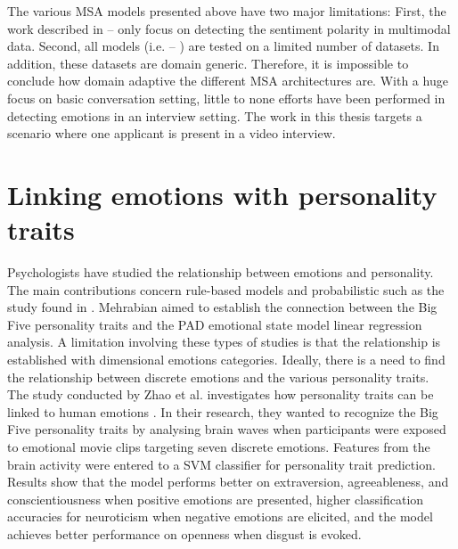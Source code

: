 The various MSA models presented above have two major limitations: First, the work described in \cite{late_fusion_cai2015convolutional} -- \cite{bimodal-fusion1-10.1145/3462244.3479919} only focus on detecting the sentiment polarity in multimodal data. Second, all models (i.e. \cite{tensor_fusion_network_2017} -- \cite{ICON_hazarika-etal-2018-icon}) are tested on a limited number of datasets. In addition, these datasets are domain generic. Therefore, it is impossible to conclude how domain adaptive the different MSA architectures are. With a huge focus on basic conversation setting, little to none efforts have been performed in detecting emotions in an interview setting. The work in this thesis targets a scenario where one applicant is present in a video interview. 

\section{Linking emotions with personality traits}
\label{sec:emotion-personality-link}
Psychologists have studied the relationship between emotions and personality. The main contributions concern rule-based models \cite{rule_based_model_johns2001emotions} and probabilistic such as the study found in \cite{probability_model_andre2000integrating}. Mehrabian \cite{PAD_regression_mehrabian1996pleasure} aimed to establish the connection between the Big Five personality traits and the PAD emotional state model  linear regression analysis. A limitation involving these types of studies is that the relationship is established with dimensional emotions categories. Ideally, there is a need to find the relationship between discrete emotions and the various personality traits.  \\ 

The study conducted by Zhao et al. \cite{Zhao2018} investigates how personality traits can be linked to human emotions \cite{HP_RPP}. In their research, they wanted to recognize the Big Five personality traits by analysing brain waves when participants were exposed to emotional movie clips targeting seven discrete emotions. Features from the brain activity were entered to a SVM classifier for personality trait prediction. Results show that the model performs better on extraversion, agreeableness, and conscientiousness when positive emotions are presented, higher classification accuracies for neuroticism when negative emotions are elicited, and the model achieves better performance on openness when disgust is evoked. \\

